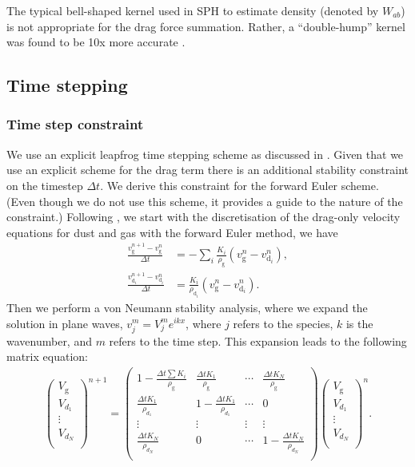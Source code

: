 \documentclass[fleqn,usenatbib]{mnras}
\newcommand{\g}{\mathrm{g}}
\newcommand{\dd}{\mathrm{d}}
\begin{document}
The typical bell-shaped kernel used in SPH to estimate density (denoted by
\(W_{ab}\)) is not appropriate for the drag force summation. Rather, a
``double-hump'' kernel was found to be 10x more accurate
\citep{Laibe2012MNRAS.420.2345L}.

\subsection{Time stepping}

\subsubsection{Time step constraint}

We use an explicit leapfrog time stepping scheme as discussed in
\citet{Price2018PASA...35...31P}. Given that we use an explicit scheme for the
drag term there is an additional stability constraint on the timestep \(\Delta
t\). We derive this constraint for the forward Euler scheme. (Even though we do
not use this scheme, it provides a guide to the nature of the constraint.)
Following \citet{Laibe2012MNRAS.420.2345L}, we start with the discretisation of
the drag-only velocity equations for dust and gas with the forward Euler method,
we have
%
\begin{align}
   \frac{v_{\g}^{n+1} - v_{\g}^n}{\Delta t} &= - \sum_i \frac{K_i}{\rho_{\g}} \left(v_{\g}^n - v_{\dd_i}^n\right), \\
   \frac{v_{\dd_i}^{n+1} - v_{\dd_i}^n}{\Delta t} &= \frac{K_i}{\rho_{\dd_i}} \left(v_{\g}^n - v_{\dd_i}^n\right).
\end{align}
%
Then we perform a von Neumann stability analysis, where we expand the solution
in plane waves, \(v_j^m = V_j^m e^{i k x}\), where \(j\) refers to the species,
\(k\) is the wavenumber, and \(m\) refers to the time step. This expansion leads
to the following matrix equation:
%
\begin{align}
   \begin{pmatrix}
      V_{\g} \\ V_{d_1} \\ \vdots \\ V_{d_N} \\
   \end{pmatrix}^{n+1} =
   \begin{pmatrix}
      1 - \frac{\Delta t \sum K_i}{\rho_{\g}} & \frac{\Delta t K_1}{\rho_{\g}} & \cdots & \frac{\Delta t K_N}{\rho_{\g}} \\
      \frac{\Delta t K_1}{\rho_{d_1}} & 1 - \frac{\Delta t K_1}{\rho_{d_1}} & \cdots & 0 \\
      \vdots & \vdots & \vdots & \vdots \\
      \frac{\Delta t K_N}{\rho_{d_N}} & 0 & \cdots & 1 - \frac{\Delta t K_N}{\rho_{d_N}} \\
   \end{pmatrix}
   \begin{pmatrix}
      V_{\g} \\ V_{d_1} \\ \vdots \\ V_{d_N} \\
   \end{pmatrix}^{n}.
\end{align}
\end{document}
